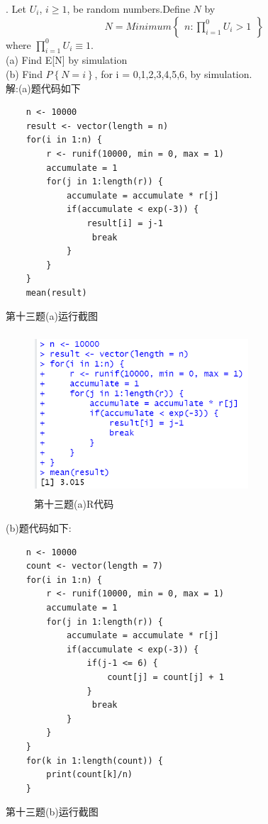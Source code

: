 \documentclass{book}
\begin{document}
. Let $U_{i}$, $i \geq 1$, be random numbers.Define $N$ by
$$
    N = Minimum
    \left\{
    \begin{array}{l}
        n:\prod_{i=1}^{0}U_{i} > 1
    \end{array}
    \right\}
$$
where $\prod_{i=1}^{0}U_{i} \equiv 1$. \\
(a) Find E[N] by simulation \\
(b) Find $P\left\{N=i\right\}$, for i = 0,1,2,3,4,5,6, by simulation. \\
解:(a)题代码如下
\lstset{language = R}
\begin{lstlisting}
    n <- 10000
    result <- vector(length = n)
    for(i in 1:n) {
        r <- runif(10000, min = 0, max = 1)
        accumulate = 1
        for(j in 1:length(r)) {
            accumulate = accumulate * r[j]
            if(accumulate < exp(-3)) {
                result[i] = j-1
                 break
            }
        }
    }
    mean(result)
\end{lstlisting}
第十三题(a)运行截图
\begin{figure}[H]
    \centering
    \includegraphics*[height = 6cm, width = 8cm]{gramFile/第十三题(a)运行截图.PNG}
    \caption{第十三题(a)R代码}
\end{figure}
\noindent
(b)题代码如下:
\lstset{language = R}
\begin{lstlisting}
    n <- 10000
    count <- vector(length = 7)
    for(i in 1:n) {
        r <- runif(10000, min = 0, max = 1)
        accumulate = 1
        for(j in 1:length(r)) {
            accumulate = accumulate * r[j]
            if(accumulate < exp(-3)) {
                if(j-1 <= 6) {
                    count[j] = count[j] + 1
                }
                 break
            }
        }
    }
    for(k in 1:length(count)) {
        print(count[k]/n)
    }
\end{lstlisting}
第十三题(b)运行截图
\end{document}
